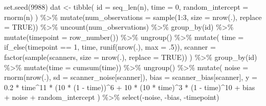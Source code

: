\documentclass[
]{book}
\newenvironment{Shaded}{\begin{snugshade}}{\end{snugshade}}
\newcommand{\AttributeTok}[1]{\textcolor[rgb]{0.77,0.63,0.00}{#1}}
\newcommand{\ConstantTok}[1]{\textcolor[rgb]{0.00,0.00,0.00}{#1}}
\newcommand{\DecValTok}[1]{\textcolor[rgb]{0.00,0.00,0.81}{#1}}
\newcommand{\FloatTok}[1]{\textcolor[rgb]{0.00,0.00,0.81}{#1}}
\newcommand{\FunctionTok}[1]{\textcolor[rgb]{0.00,0.00,0.00}{#1}}
\newcommand{\NormalTok}[1]{#1}
\newcommand{\OtherTok}[1]{\textcolor[rgb]{0.56,0.35,0.01}{#1}}
\newcommand{\SpecialCharTok}[1]{\textcolor[rgb]{0.00,0.00,0.00}{#1}}
\begin{document}
\begin{Shaded}
\begin{Highlighting}[]
\FunctionTok{set.seed}\NormalTok{(}\DecValTok{9988}\NormalTok{)}
\NormalTok{dat }\OtherTok{\textless{}{-}} \FunctionTok{tibble}\NormalTok{(}
  \AttributeTok{id =} \FunctionTok{seq\_len}\NormalTok{(n), }
  \AttributeTok{time =} \DecValTok{0}\NormalTok{,}
  \AttributeTok{random\_intercept =} \FunctionTok{rnorm}\NormalTok{(n)}
\NormalTok{  ) }\SpecialCharTok{\%\textgreater{}\%} 
  \FunctionTok{mutate}\NormalTok{(}\AttributeTok{num\_observations =} \FunctionTok{sample}\NormalTok{(}\DecValTok{1}\SpecialCharTok{:}\DecValTok{3}\NormalTok{, }\AttributeTok{size =} \FunctionTok{nrow}\NormalTok{(.), }\AttributeTok{replace =} \ConstantTok{TRUE}\NormalTok{)) }\SpecialCharTok{\%\textgreater{}\%} 
  \FunctionTok{uncount}\NormalTok{(num\_observations) }\SpecialCharTok{\%\textgreater{}\%} 
  \FunctionTok{group\_by}\NormalTok{(id) }\SpecialCharTok{\%\textgreater{}\%} 
  \FunctionTok{mutate}\NormalTok{(}\AttributeTok{timepoint =} \FunctionTok{row\_number}\NormalTok{()) }\SpecialCharTok{\%\textgreater{}\%} 
  \FunctionTok{ungroup}\NormalTok{() }\SpecialCharTok{\%\textgreater{}\%} 
  \FunctionTok{mutate}\NormalTok{(}
    \AttributeTok{time =} \FunctionTok{if\_else}\NormalTok{(timepoint }\SpecialCharTok{==} \DecValTok{1}\NormalTok{, time, }\FunctionTok{runif}\NormalTok{(}\FunctionTok{nrow}\NormalTok{(.), }\AttributeTok{max =}\NormalTok{ .}\DecValTok{5}\NormalTok{)),}
    \AttributeTok{scanner =} \FunctionTok{factor}\NormalTok{(}\FunctionTok{sample}\NormalTok{(scanners, }\AttributeTok{size =} \FunctionTok{nrow}\NormalTok{(.), }\AttributeTok{replace =} \ConstantTok{TRUE}\NormalTok{))}
\NormalTok{    ) }\SpecialCharTok{\%\textgreater{}\%} 
  \FunctionTok{group\_by}\NormalTok{(id) }\SpecialCharTok{\%\textgreater{}\%} 
  \FunctionTok{mutate}\NormalTok{(}\AttributeTok{time =} \FunctionTok{cumsum}\NormalTok{(time)) }\SpecialCharTok{\%\textgreater{}\%} 
  \FunctionTok{ungroup}\NormalTok{() }\SpecialCharTok{\%\textgreater{}\%} 
  \FunctionTok{mutate}\NormalTok{(}
    \AttributeTok{noise =} \FunctionTok{rnorm}\NormalTok{(}\FunctionTok{nrow}\NormalTok{(.), }\AttributeTok{sd =}\NormalTok{ scanner\_noise[scanner]),}
    \AttributeTok{bias =}\NormalTok{ scanner\_bias[scanner],}
    \AttributeTok{y =} \FloatTok{0.2} \SpecialCharTok{*}\NormalTok{ time}\SpecialCharTok{\^{}}\DecValTok{11} \SpecialCharTok{*}\NormalTok{ (}\DecValTok{10} \SpecialCharTok{*}\NormalTok{ (}\DecValTok{1} \SpecialCharTok{{-}}\NormalTok{ time))}\SpecialCharTok{\^{}}\DecValTok{6} \SpecialCharTok{+} \DecValTok{10} \SpecialCharTok{*} 
\NormalTok{      (}\DecValTok{10} \SpecialCharTok{*}\NormalTok{ time)}\SpecialCharTok{\^{}}\DecValTok{3} \SpecialCharTok{*}\NormalTok{ (}\DecValTok{1} \SpecialCharTok{{-}}\NormalTok{ time)}\SpecialCharTok{\^{}}\DecValTok{10} \SpecialCharTok{+}\NormalTok{ bias }\SpecialCharTok{+}\NormalTok{ noise }\SpecialCharTok{+}\NormalTok{ random\_intercept}
\NormalTok{  ) }\SpecialCharTok{\%\textgreater{}\%} 
  \FunctionTok{select}\NormalTok{(}\SpecialCharTok{{-}}\NormalTok{noise, }\SpecialCharTok{{-}}\NormalTok{bias, }\SpecialCharTok{{-}}\NormalTok{timepoint)}
\end{Highlighting}
\end{Shaded}
\end{document}
